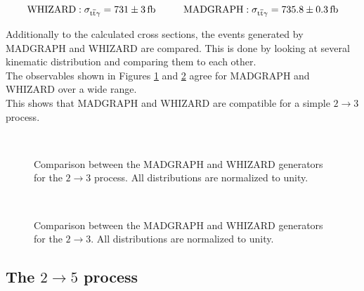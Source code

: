 \begin{equation}
\mathrm{WHIZARD: }\; \sigma_{\ttgamma} = \SI{731 \pm 3}{\femto \barn} \hspace{1.cm} \mathrm{MADGRAPH: }\;  \sigma_{\ttgamma} = \SI{735.8 \pm 0.3}{\femto \barn}
\label{eq_simu_2to3_cross}
\end{equation}

Additionally to the calculated cross sections, the events generated by MADGRAPH and WHIZARD are compared. This is done by looking  at several kinematic distribution and comparing them to each other. \\
The observables shown in Figures \ref{fig_simu_comp_2to3_1} and \ref{fig_simu_comp_2to3_2} agree for MADGRAPH and WHIZARD over a wide range.\\
This shows that MADGRAPH and WHIZARD are compatible for a simple $2 \to 3$ process.

\begin{figure}
  \\
  \caption{Comparison between the MADGRAPH and WHIZARD generators for the $2 \to 3$ process. All distributions are normalized to unity.}
  \label{fig_simu_comp_2to3_1}
\end{figure}

\begin{figure}
  \\
  \caption{Comparison between the MADGRAPH and WHIZARD generators for the $2 \to 3$. All distributions are normalized to unity.}
  \label{fig_simu_comp_2to3_2}
\end{figure}


\subsection{The $2 \to 5$ process}

